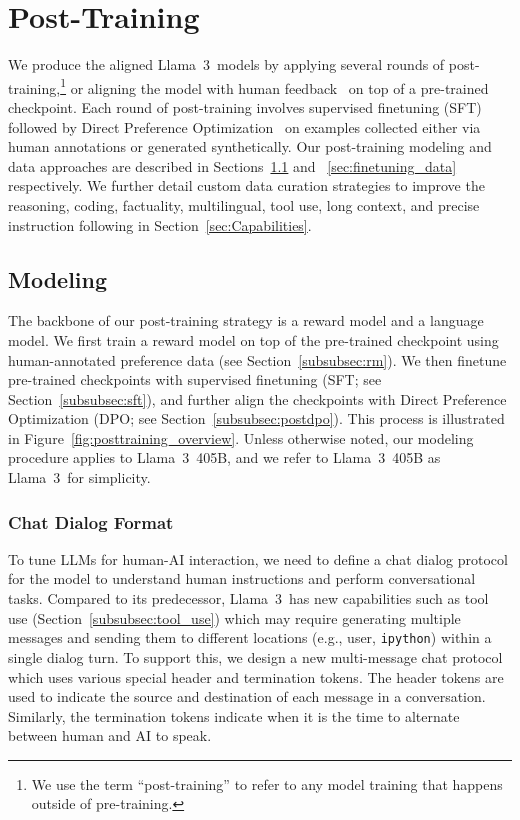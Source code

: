\section{Post-Training}
\label{section:finetuning}
We produce the aligned Llama~3~models by applying several rounds of post-training,\footnote{We use the term ``post-training'' to refer to any model training that happens outside of pre-training.} or aligning the model with human feedback~\citep{ouyang2022instructgpt,rafailov2024direct} on top of a pre-trained checkpoint. Each round of post-training involves supervised finetuning (SFT) followed by Direct Preference Optimization~\citep[DPO;][]{rafailov2024direct} on examples collected either via human annotations or generated synthetically. Our post-training modeling and data approaches are described in Sections~\ref{sec:finetuning_modeling} and ~\ref{sec:finetuning_data} respectively. We further detail custom data curation strategies to improve the reasoning, coding, factuality, multilingual, tool use, long context, and precise instruction following in Section~\ref{sec:Capabilities}.

\subsection{Modeling}
\label{sec:finetuning_modeling}
The backbone of our post-training strategy is a reward model and a language model. We first train a reward model on top of the pre-trained checkpoint using human-annotated preference data (see Section~\ref{subsubsec:rm}). We then finetune pre-trained checkpoints with supervised finetuning (SFT; see Section~\ref{subsubsec:sft}), and further align the checkpoints with Direct Preference Optimization (DPO; see Section~\ref{subsubsec:postdpo}).
This process is illustrated in Figure~\ref{fig:posttraining_overview}.
Unless otherwise noted, our modeling procedure applies to Llama~3~405B, and we refer to Llama~3~405B as Llama~3~for simplicity. 

\subsubsection{Chat Dialog Format}
\label{subsubsec:chat_format_content}

To tune LLMs for human-AI interaction, we need to define a chat dialog protocol for the model to understand human instructions and perform conversational tasks. Compared to its predecessor, Llama~3~has new capabilities such as tool use (Section~\ref{subsubsec:tool_use}) which may require generating multiple messages and sending them to different locations (e.g., user, \texttt{ipython}) within a single dialog turn. To support this, we design a new multi-message chat protocol which uses various special header and termination tokens. The header tokens are used to indicate the source and destination of each message in a conversation. Similarly, the termination tokens indicate when it is the time to alternate between human and AI to speak. 

